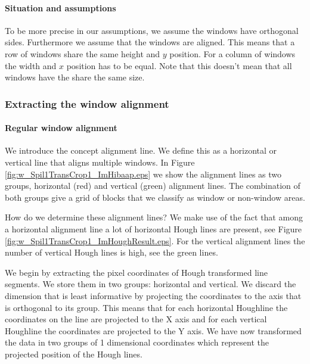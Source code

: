 \paragraph{Situation and assumptions}
To be more precise in our assumptions, we assume the windows have orthogonal
sides.  Furthermore we assume that the windows are aligned. This means that a
row of windows share the same height and $y$ position. For a column of windows
the width and $x$ position has to be equal.  Note that this doesn't mean that
all windows have the share the same size.



\subsubsection{Extracting the window alignment}
\paragraph{Regular window alignment}
We introduce the concept alignment line. We define this as a horizontal or
vertical line that aligns multiple windows. In Figure
\ref{fig:w_Spil1TransCrop1_ImHibaap.eps}
we show the alignment lines as two groups, horizontal (red) and
vertical (green) alignment lines.  The combination of both groups give a grid of
blocks that we classify as window or non-window areas.\\



How do we determine these alignment lines? We make use of the fact that among a
horizontal alignment line a lot of horizontal Hough lines are present, see
Figure \ref{fig:w_Spil1TransCrop1_ImHoughResult.eps}. For the vertical alignment lines
the number of vertical Hough lines is high, see the green lines.

We begin by extracting the pixel coordinates of Hough transformed line
segments. We store them in two groups: horizontal and vertical.%
We discard the dimension that is least informative by projecting the coordinates to
the axis that is orthogonal to its group. 
This means that for each horizontal Houghline the coordinates on the line are projected to the X
axis and for each vertical Houghline the coordinates are projected to the Y
axis. We have now transformed the data in two groups of 1 dimensional
coordinates which represent the projected position of the Hough lines.\\

